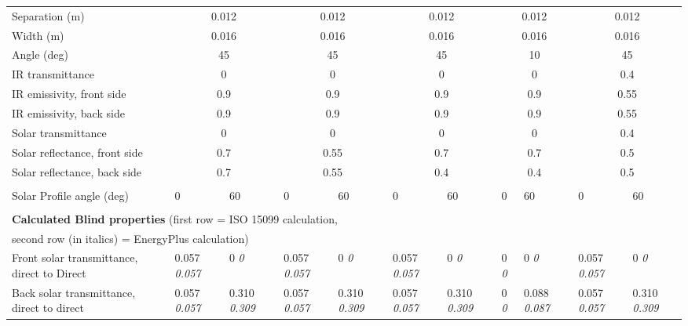 \begin{longtable}[c]{p{1.0in}p{0.4in}p{0.4in}p{0.4in}p{0.4in}p{0.4in}p{0.4in}p{0.4in}p{0.4in}p{0.4in}p{0.4in}}
Separation (m) & \multicolumn{2}{c}{0.012} & \multicolumn{2}{c}{0.012} & \multicolumn{2}{c}{0.012} & \multicolumn{2}{c}{0.012} & \multicolumn{2}{c}{0.012} \tabularnewline
Width (m) & \multicolumn{2}{c}{0.016} & \multicolumn{2}{c}{0.016} & \multicolumn{2}{c}{0.016} & \multicolumn{2}{c}{0.016} & \multicolumn{2}{c}{0.016} \tabularnewline
Angle (deg) & \multicolumn{2}{c}{45} & \multicolumn{2}{c}{45} & \multicolumn{2}{c}{45} & \multicolumn{2}{c}{10} & \multicolumn{2}{c}{45} \tabularnewline
IR transmittance & \multicolumn{2}{c}{0} & \multicolumn{2}{c}{0} & \multicolumn{2}{c}{0} & \multicolumn{2}{c}{0} & \multicolumn{2}{c}{0.4} \tabularnewline
IR emissivity, front side & \multicolumn{2}{c}{0.9} & \multicolumn{2}{c}{0.9} & \multicolumn{2}{c}{0.9} & \multicolumn{2}{c}{0.9} & \multicolumn{2}{c}{0.55} \tabularnewline
IR emissivity, back side & \multicolumn{2}{c}{0.9} & \multicolumn{2}{c}{0.9} & \multicolumn{2}{c}{0.9} & \multicolumn{2}{c}{0.9} & \multicolumn{2}{c}{0.55} \tabularnewline
Solar transmittance & \multicolumn{2}{c}{0} & \multicolumn{2}{c}{0} & \multicolumn{2}{c}{0} & \multicolumn{2}{c}{0} & \multicolumn{2}{c}{0.4} \tabularnewline
Solar reflectance, front side & \multicolumn{2}{c}{0.7} & \multicolumn{2}{c}{0.55} & \multicolumn{2}{c}{0.7} & \multicolumn{2}{c}{0.7} & \multicolumn{2}{c}{0.5} \tabularnewline
Solar reflectance, back side & \multicolumn{2}{c}{0.7} & \multicolumn{2}{c}{0.55} & \multicolumn{2}{c}{0.4} & \multicolumn{2}{c}{0.4} & \multicolumn{2}{c}{0.5} \tabularnewline \midrule
 \tabularnewline \midrule
Solar Profile angle (deg) & 0 & 60 & 0 & 60 & 0 & 60 & 0 & 60 & 0 & 60 \tabularnewline \midrule
 \tabularnewline \midrule
\multicolumn{11}{l}{\textbf{Calculated Blind properties} (first row = ISO 15099 calculation,} \tabularnewline
\multicolumn{11}{l}{second row (in italics) = EnergyPlus calculation)} \tabularnewline \midrule
Front solar transmittance, direct to Direct & 0.057 \quad \quad \textit{0.057} & 0 \quad \quad \textit{0} & 0.057 \quad \quad \textit{0.057} & 0 \quad \quad \textit{0} & 0.057 \quad \quad \textit{0.057} & 0 \quad \quad \textit{0} & 0 \quad \quad \textit{0} & 0 \quad \quad \textit{0} & 0.057 \quad \quad \textit{0.057} & 0 \quad \quad \textit{0} \tabularnewline
Back solar transmittance, direct to direct & 0.057 \quad \quad \textit{0.057} & 0.310 \quad \quad \textit{0.309} & 0.057 \quad \quad \textit{0.057} & 0.310 \quad \quad \textit{0.309} & 0.057 \quad \quad \textit{0.057} & 0.310 \quad \quad \textit{0.309} & 0 \quad \quad \textit{0} & 0.088 \quad \quad \textit{0.087} & 0.057 \quad \quad \textit{0.057} & 0.310 \quad \quad \textit{0.309} \tabularnewline

\end{longtable}
